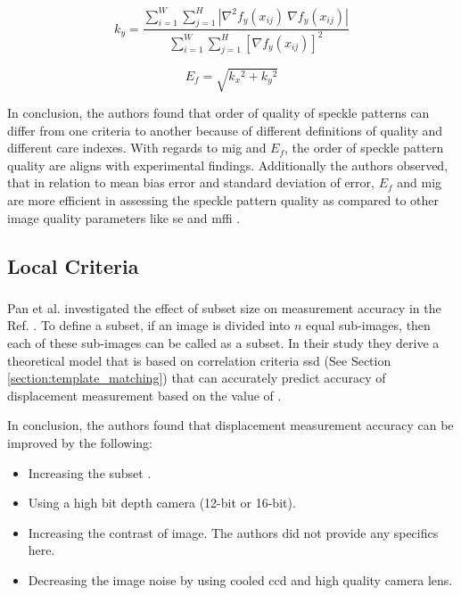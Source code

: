         \begin{equation}
            k_y = \dfrac{ \sum_{i=1}^{W} \sum_{j=1}^{H} |\nabla^2 f_y (x_{ij}) \ \nabla f_y (x_{ij}) | }{ \sum_{i=1}^{W} \sum_{j=1}^{H} [\nabla f_y (x_{ij})]^2 }
            \label{eqn:ef_ky}
        \end{equation}

        \begin{equation}
            E_f = \sqrt{k{_x}^{2} + k{_y}^{2}}
        \end{equation}

        \noindent In conclusion, the authors found that order of quality of speckle patterns can differ from one criteria to another because of different definitions of quality and different care indexes. With regards to \gls{mig} and $E_f$, the order of speckle pattern quality are aligns with experimental findings. Additionally the authors observed, that in relation to mean bias error and standard deviation of error, $E_f$ and \gls{mig} are more efficient in assessing the speckle pattern quality as compared to other image quality parameters like \gls{se} and \gls{mffi} \cite{hu_ef}.
        
    \subsection{Local Criteria}

    \subsubsection{}\label{subsubsection:sssig}
    Pan et al. investigated the effect of subset size on measurement accuracy in the Ref. \cite{pan_subset}.  To define a subset, if an image is divided into $n$ equal sub-images, then each of these sub-images can be called as a subset. In their study they derive a theoretical model that is based on correlation criteria \gls{ssd} (See Section \ref{section:template_matching}) that can accurately predict accuracy of displacement measurement based on the value of .

    \vspace{5mm}
    \noindent In conclusion, the authors found that displacement measurement accuracy can be improved by the following:
    \begin{itemize}
        \item Increasing the subset .
        \item Using a high bit depth camera (12-bit or 16-bit).
        \item Increasing the contrast of image. The authors did not provide any specifics here.
        \item Decreasing the image noise by using cooled \gls{ccd} and high quality camera lens.
    \end{itemize}


